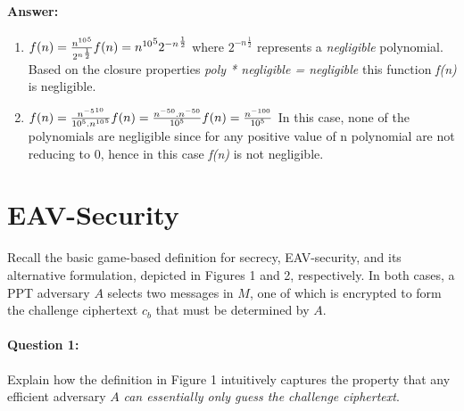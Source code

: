 \documentclass{article}
\begin{document}
    \paragraph{Answer: \newline}
        \begin{enumerate}
            \item 
                \begin{math}
                    f(n) = \frac{{n^{10}}^5}{{2^n}^\frac{1}{2}}\\
                    f(n) = {{n^{10}}^5}{{2^{-n}}^{\frac{1}{2}}}\\                    
                \end{math}
                where ${{2^{-n}}^{\frac{1}{2}}}$ represents a \emph{negligible} polynomial.
                Based on the closure properties \emph{poly * negligible = negligible} this function \emph{f(n)} is negligible.
            \item 
                \begin{math}
                    f(n) = \frac{{n^{-5}}^{10}}{{10^5}.{{n^{10}}^5}}\\
                    f(n) = \frac{{n^{-50}}.{n^{-50}}}{{10^5}}\\
                    f(n) = \frac{{n^{-100}}}{{10^5}}\\
                \end{math}
                In this case, none of the polynomials are negligible since for any positive value of n polynomial are not reducing to 0, hence in this case \emph{f(n)} is not negligible.
        \end{enumerate}
    
\section{EAV-Security}
    Recall the basic game-based definition for secrecy, EAV-security, and its alternative formulation, depicted in Figures 1 and 2, respectively. In both cases, a PPT adversary $\mathit{A}$ selects two messages in $\mathit{M}$, one of which is encrypted to form the challenge ciphertext $c_b$ that must be determined by $\mathit{A}$.
    
    \paragraph{Question 1:} Explain how the definition in Figure 1 intuitively captures the property that any efficient adversary $\mathit{A}$ \emph{can essentially only guess the challenge ciphertext}.
    
\end{document}
